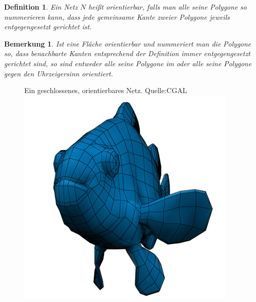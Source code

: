 \documentclass[]{article}
\newtheorem{Definition}{Definition}
\newtheorem{Bemerkung}{Bemerkung}
\begin{document}
\begin{Definition}
Ein Netz $N$ heißt orientierbar, falls man alle seine Polygone so nummerieren kann, dass jede gemeinsame Kante zweier Polygone jeweils entgegengesetzt gerichtet ist. 
\end{Definition}


  

\begin{Bemerkung}
Ist eine Fläche orientierbar und nummeriert man die Polygone so, dass benachbarte Kanten entsprechend der Definition immer entgegengesetzt gerichtet sind, so sind entweder alle seine Polygone im oder alle seine Polygone gegen den Uhrzeigersinn orientiert.
\end{Bemerkung}

\begin{figure}[H]
\centering
Ein geschlossenes, orientierbares Netz. Quelle:CGAL \\
\includegraphics[scale=0.3]{clown_fish.jpg}
\end{figure}
\end{document}
